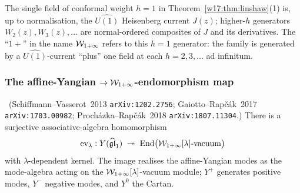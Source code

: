 \begin{remark}[The $h = 1$ generator is the $\widehat{U(1)}$ current]
\label{w17:rem:h1-generator}
The single field of conformal weight $h = 1$ in Theorem~\ref{w17:thm:linshaw}(1)
is, up to normalisation, the $\widehat{U(1)}$ Heisenberg current $J(z)$; higher-$h$
generators $W_2(z), W_3(z), \ldots$ are normal-ordered composites of $J$ and its
derivatives. The ``$1 +$'' in the name $\mathcal{W}_{1+\infty}$ refers to this $h = 1$ generator:
the family is generated by a $\widehat{U(1)}$-current ``plus'' one field at each
$h = 2, 3, \ldots$ ad infinitum.
\end{remark}

\subsubsection{The affine-Yangian $\to \mathcal{W}_{1+\infty}$-endomorphism map}
\label{w17:subsubsec:yangian-to-w-end}

\begin{theorem}
\label{w17:thm:yangian-to-w}
\ClaimStatusProvedElsewhere\ (Schiffmann--Vasserot~2013 \texttt{arXiv:1202.2756};
Gaiotto--Rap\v c\'ak~2017 \texttt{arXiv:1703.00982};
Proch\'azka--Rap\v c\'ak~2018 \texttt{arXiv:1807.11304}.) There is a
surjective associative-algebra homomorphism
\begin{equation}
\label{w17:eq:evaluation}
 \mathrm{ev}_\lambda :
 Y(\widehat{\mathfrak{gl}}_1) \;\twoheadrightarrow\; \mathrm{End}\bigl(\mathcal{W}_{1+\infty}[\lambda]\text{-vacuum}\bigr)
\end{equation}
with $\lambda$-dependent kernel. The image realises the affine-Yangian modes as
the mode-algebra acting on the $\mathcal{W}_{1+\infty}[\lambda]$-vacuum module; $Y^+$ generates
positive modes, $Y^-$ negative modes, and $Y^0$ the Cartan.
\end{theorem}

